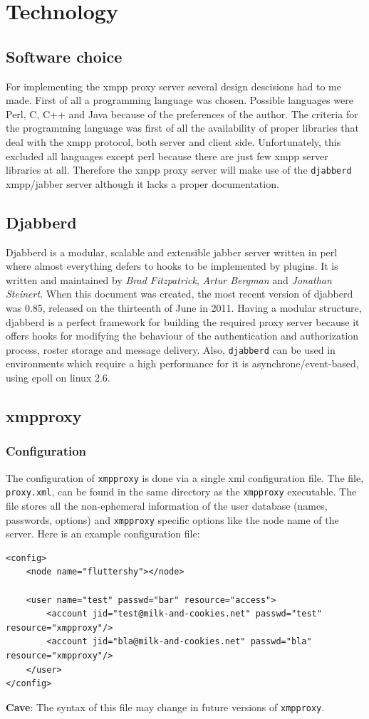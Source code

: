 \documentclass[a4paper,10pt,numbers=noendperiod]{scrartcl}
\begin{document}
\section{Technology}
\subsection{Software choice}
For implementing the xmpp proxy server several design descisions had to me made. First of all a programming language was chosen. Possible languages were Perl, C, C++ and Java because of the preferences of the author. The criteria for the programming language was first of all the availability of proper libraries that deal with the xmpp protocol, both server and client side.  Unfortunately, this excluded all languages except perl because there are just few xmpp server libraries at all. Therefore the xmpp proxy server will make use of the \texttt{djabberd} xmpp/jabber server although it lacks a proper documentation.
\subsection{Djabberd}
Djabberd is a modular, scalable and extensible jabber server written in perl where almost everything defers to hooks to be implemented by plugins. %
It is written and maintained by \textit{Brad Fitzpatrick}, \textit{Artur Bergman} and \textit{Jonathan Steinert}.
When this document was created, the most recent version of djabberd was 0.85, released on the thirteenth of June in 2011. Having a modular structure, djabberd is a perfect framework for building the required proxy server because it offers hooks for modifying the behaviour of the authentication and authorization process, roster storage and message delivery. Also, \texttt{djabberd} can be used in environments which require a high performance for it is asynchrone/event-based, using epoll on linux 2.6.
\subsection{xmpproxy}
\subsubsection{Configuration}
The configuration of \texttt{xmpproxy} is done via a single xml configuration file. The file, \texttt{proxy.xml}, can be found in the same directory as the \texttt{xmpproxy} executable. The file stores all the non-ephemeral information of the user database (names, passwords, options) and \texttt{xmpproxy} specific options like the node name of the server. 
Here is an example configuration file:
\begin{lstlisting}
<config>
	<node name="fluttershy"></node>

	<user name="test" passwd="bar" resource="access">
		<account jid="test@milk-and-cookies.net" passwd="test" resource="xmpproxy"/>
		<account jid="bla@milk-and-cookies.net" passwd="bla" resource="xmpproxy"/>
	</user>
</config>
\end{lstlisting}
\textbf{Cave}: The syntax of this file may change in future versions of \texttt{xmpproxy}.
\end{document}
